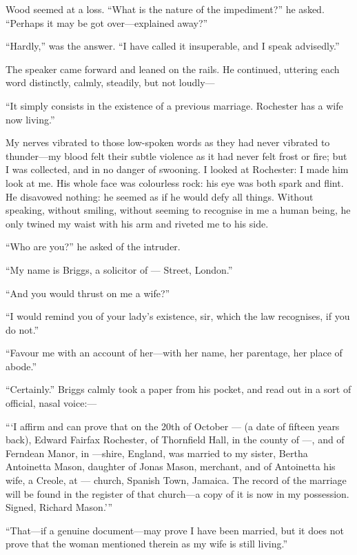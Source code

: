 \Mr{} Wood seemed at a loss. \enquote{What is the nature of the
impediment?} he asked. \enquote{Perhaps it may be got over---explained
away?}

\enquote{Hardly,} was the answer. \enquote{I have called it
insuperable, and I speak advisedly.}

The speaker came forward and leaned on the rails. He continued,
uttering each word distinctly, calmly, steadily, but not loudly---

\enquote{It simply consists in the existence of a previous marriage. 
\Mr{} Rochester has a wife now living.}

My nerves vibrated to those low-spoken words as they had never vibrated
to thunder---my blood felt their subtle violence as it had never felt
frost or fire; but I was collected, and in no danger of swooning. I
looked at \Mr{} Rochester: I made him look at me. His whole face was
colourless rock: his eye was both spark and flint. He disavowed
nothing: he seemed as if he would defy all things. Without speaking,
without smiling, without seeming to recognise in me a human being, he
only twined my waist with his arm and riveted me to his side.

\enquote{Who are you?} he asked of the intruder.

\enquote{My name is Briggs, a solicitor of --- Street, London.}

\enquote{And you would thrust on me a wife?}

\enquote{I would remind you of your lady's existence, sir, which the law
recognises, if you do not.}

\enquote{Favour me with an account of her---with her name, her
parentage, her place of abode.}

\enquote{Certainly.} \Mr{} Briggs calmly took a paper from his pocket,
and read out in a sort of official, nasal voice:---

\enquote{\enquote{I affirm and can prove that on the 20th of October
\AD{} --- (a date of fifteen years back), Edward Fairfax Rochester, of
Thornfield Hall, in the county of ---, and of Ferndean Manor, in
---shire, England, was married to my sister, Bertha Antoinetta Mason,
daughter of Jonas Mason, merchant, and of Antoinetta his wife, a Creole,
at --- church, Spanish Town, Jamaica. The record of the marriage will
be found in the register of that church---a copy of it is now in my
possession. Signed, Richard Mason.}}

\enquote{That---if a genuine document---may prove I have been married,
but it does not prove that the woman mentioned therein as my wife is
still living.}

